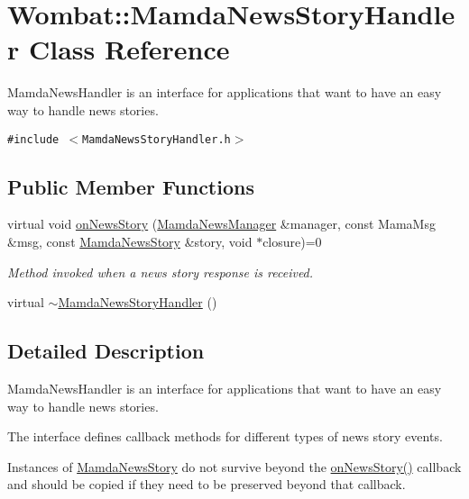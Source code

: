 \hypertarget{classWombat_1_1MamdaNewsStoryHandler}{
\section{Wombat::Mamda\-News\-Story\-Handler Class Reference}
\label{classWombat_1_1MamdaNewsStoryHandler}
}
Mamda\-News\-Handler is an interface for applications that want to have an easy way to handle news stories.  


{\tt \#include $<$Mamda\-News\-Story\-Handler.h$>$}

\subsection*{Public Member Functions}
\begin{CompactItemize}
\item 
virtual void \hyperlink{classWombat_1_1MamdaNewsStoryHandler_e519358a9619a104431605d9313cee58}{on\-News\-Story} (\hyperlink{classWombat_1_1MamdaNewsManager}{Mamda\-News\-Manager} \&manager, const Mama\-Msg \&msg, const \hyperlink{classWombat_1_1MamdaNewsStory}{Mamda\-News\-Story} \&story, void $\ast$closure)=0
\begin{CompactList}\small\item\em Method invoked when a news story response is received. \item\end{CompactList}\item 
virtual \hyperlink{classWombat_1_1MamdaNewsStoryHandler_8073b40cb9d0d6ae6b881ba3c83d5a1e}{$\sim$Mamda\-News\-Story\-Handler} ()
\end{CompactItemize}


\subsection{Detailed Description}
Mamda\-News\-Handler is an interface for applications that want to have an easy way to handle news stories. 

The interface defines callback methods for different types of news story events.

Instances of \hyperlink{classWombat_1_1MamdaNewsStory}{Mamda\-News\-Story} do not survive beyond the \hyperlink{classWombat_1_1MamdaNewsStoryHandler_e519358a9619a104431605d9313cee58}{on\-News\-Story()} callback and should be copied if they need to be preserved beyond that callback. 



